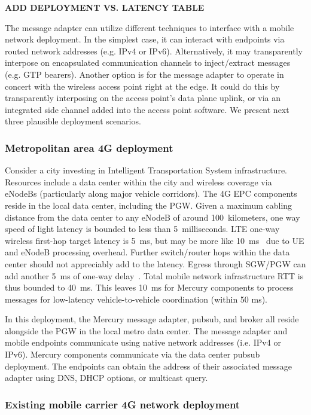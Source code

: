 {\bf ADD DEPLOYMENT VS. LATENCY TABLE}

The message adapter can utilize different techniques to interface with
a mobile network deployment. In the simplest case, it can interact
with endpoints via routed network addresses (e.g. IPv4 or
IPv6). Alternatively, it may transparently interpose on encapsulated
communication channels to inject/extract messages (e.g. GTP
bearers). Another option is for the message adapter to operate in
concert with the wireless access point right at the edge. It could do
this by transparently interposing on the access point's data plane
uplink, or via an integrated side channel added into the access point
software.  We present next three plausible deployment scenarios.

\subsubsection{Metropolitan area 4G deployment}

Consider a city investing in Intelligent Transportation System
infrastructure. Resources include a data center within the city and
wireless coverage via eNodeBs (particularly along major vehicle
corridors). The 4G EPC components reside in the local data center,
including the PGW.  Given a maximum cabling distance from the data
center to any eNodeB of around 100~kilometers, one way speed of light
latency is bounded to less than 5~milliseconds.  LTE one-way wireless
first-hop target latency is 5~ms, but may be more like
10~ms~\cite{RAN-latency} due to UE and eNodeB processing overhead.
Further switch/router hops within the data center should not
appreciably add to the latency. Egress through SGW/PGW can add another
5~ms of one-way delay~\cite{EPC-latency}.  Total mobile network
infrastructure RTT is thus bounded to 40~ms. This leaves 10~ms for
Mercury components to process messages for low-latency
vehicle-to-vehicle coordination (within 50 ms).

In this deployment, the Mercury message adapter, pubsub, and broker
all reside alongside the PGW in the local metro data center. The
message adapter and mobile endpoints communicate using native network
addresses (i.e. IPv4 or IPv6).  Mercury components communicate via the
data center pubsub deployment. The endpoints can obtain the address
of their associated message adapter using DNS, DHCP options, or
multicast query.

\subsubsection{Existing mobile carrier 4G network deployment}

